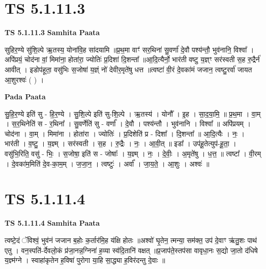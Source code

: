 \documentclass[17pt]{extarticle}
\begin{document}

\section{ TS 5.1.11.3 }

\textbf{TS 5.1.11.3 } \newline
\textbf{Samhita Paata} \newline

सुहिर॒ण्ये सु॑शि॒ल्पे ऋ॒तस्य॒ योना॑वि॒ह सा॑दयामि ॥प्र॒थ॒मा वाꣳ॑ सर॒थिना॑ सु॒वर्णा॑ दे॒वौ पश्य॑न्तौ॒ भुव॑नानि॒ विश्वा᳚ । अपि॑प्रयं॒ चोद॑ना वां॒ मिमा॑ना॒ होता॑रा॒ ज्योतिः॑ प्र॒दिशा॑ दि॒शन्ता᳚ ॥आ॒दि॒त्यैर्नो॒ भार॑ती वष्टु य॒ज्ञ्ꣳ सर॑स्वती स॒ह रु॒द्रैर्न॑ आवीत् । इडोप॑हूता॒ वसु॑भिः स॒जोषा॑ य॒ज्ञ्ं नो॑ देवीर॒मृते॑षु धत्त ॥त्वष्टा॑ वी॒रं दे॒वका॑मं जजान॒ त्वष्टु॒रर्वा॑ जायत आ॒शुरश्वः॑ ( ) । \newline

\textbf{Pada Paata} \newline

सु॒हि॒र॒ण्ये इति॑ सु - हि॒र॒ण्ये । सु॒शि॒ल्पे इति॑ सु-शि॒ल्पे । ऋ॒तस्य॑ । योनौ᳚ । इ॒ह । सा॒द॒या॒मि॒ ॥ प्र॒थ॒मा । वा॒म् । स॒र॒थिनेति॑ स - र॒थिना᳚ । सु॒वर्णेति॑ सु - वर्णा᳚ । दे॒वौ । पश्य॑न्तौ । भुव॑नानि । विश्वा᳚ ॥ अपि॑प्रयम् । चोद॑ना । वा॒म् । मिमा॑ना । होता॑रा । ज्योतिः॑ । प्र॒दिशेति॑ प्र - दिशा᳚ । दि॒शन्ता᳚ ॥ आ॒दि॒त्यैः । नः॒ । भार॑ती । व॒ष्टु॒ । य॒ज्ञ्म् । सर॑स्वती । स॒ह । रु॒द्रैः । नः॒ । आ॒वी॒त् ॥ इडा᳚ । उप॑हू॒तेत्युप॑-हू॒ता॒ । वसु॑भि॒रिति॒ वसु॑ - भिः॒ । स॒जोषा॒ इति॑ स - जोषाः᳚ । य॒ज्ञ्म् । नः॒ । दे॒वीः॒ । अ॒मृते॑षु । ध॒त्त॒ ॥ त्वष्टा᳚ । वी॒रम् । दे॒वका॑म॒मिति॑ दे॒व-का॒म॒म् । ज॒जा॒न॒ । त्वष्टुः॑ । अर्वा᳚ । जा॒य॒ते॒ । आ॒शुः । अश्वः॑ ॥  \newline





\section{ TS 5.1.11.4 }

\textbf{TS 5.1.11.4 } \newline
\textbf{Samhita Paata} \newline

त्वष्टे॒दं ॅविश्वं॒ भुव॑नं जजान ब॒होः क॒र्तार॑मि॒ह य॑क्षि होतः ॥अश्वो॑ घृ॒तेन॒ त्मन्या॒ सम॑क्त॒ उप॑ दे॒वाꣳ ऋ॑तु॒शः पाथ॑ एतु । वन॒स्पति॑-र्देवलो॒कं प्र॑जा॒नन्न॒ग्निना॑ ह॒व्या स्व॑दि॒तानि॑ वक्षत् ॥प्र॒जाप॑ते॒स्तप॑सा वावृधा॒नः स॒द्यो जा॒तो द॑धिषे य॒ज्ञ्म॑ग्ने । स्वाहा॑कृतेन ह॒विषा॑ पुरोगा या॒हि सा॒द्ध्या ह॒विर॑दन्तु दे॒वाः ॥ \newline
\end{document}
